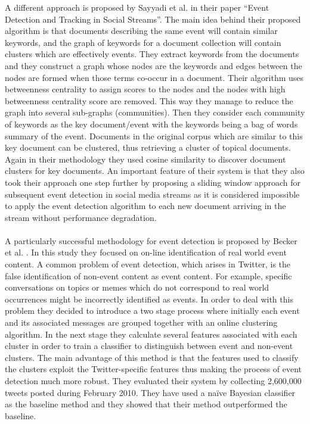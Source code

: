 A different approach is proposed by Sayyadi et al. \cite{conf/icwsm/SayyadiHM09} in their paper ``Event Detection and Tracking in Social Streams''. The main idea behind their proposed algorithm is that documents describing the same event will contain similar keywords, and the graph of keywords for a document collection will contain clusters which are effectively events. They extract keywords from the documents and they construct a graph whose nodes are the keywords and edges between the nodes are formed when those terms co-occur in a document. Their algorithm uses betweenness centrality to assign scores to the nodes and the nodes with high betweenness centrality score are removed. This way they manage to reduce the graph into several sub-graphs (communities). Then they consider each community of keywords as the key document/event with the keywords being a bag of words summary of the event. Documents in the original corpus which are similar to this key document can be clustered, thus retrieving a cluster of topical documents. Again in their methodology they used cosine similarity to discover document clusters for key documents. An important feature of their system is that they also took their approach one step further by proposing a sliding window approach for subsequent event detection in social media streams as it is considered impossible to apply the event detection algorithm to each new document arriving in the stream without performance degradation.\\\\
A particularly successful methodology for event detection is proposed by Becker et al. \cite{Becker_Gravano_2011}. In this study they focused on on-line identification of real world event content. A common problem of event detection, which arises in Twitter, is the false identification of non-event content as event content. For example, specific conversations on topics or memes which do not correspond to real world occurrences might be incorrectly identified as events. In order to deal with this problem they decided to introduce a two stage process where initially each event and its associated messages are grouped together with an online clustering algorithm. In the next stage they calculate several features associated with each cluster in order to train a classifier to distinguish between event and non-event clusters. The main advantage of this method is that the features used to classify the clusters exploit the Twitter-specific features thus making the process of event detection much more robust. They evaluated their system by collecting 2,600,000 tweets posted during February 2010. They have used a naïve Bayesian classifier as the baseline method and they showed that their method outperformed the baseline.
	 
